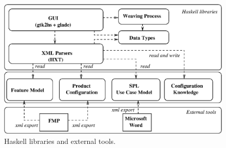 \documentclass{acm_proc_article-sp}
\begin{document}
\begin{figure}[h]
 \begin{center}
  \includegraphics[scale=0.55]{img/architecture.eps}
   \caption{Haskell libraries and external tools.}
  \label{fig:haskell-libraries}
  \end{center}
\end{figure}




%
%
%
%
\end{document}
